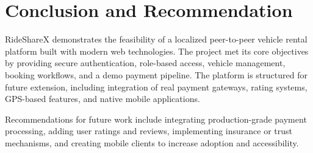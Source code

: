 \chapter{Conclusion and Recommendation}

RideShareX demonstrates the feasibility of a localized peer-to-peer vehicle rental platform built with modern web technologies. The project met its core objectives by providing secure authentication, role-based access, vehicle management, booking workflows, and a demo payment pipeline. The platform is structured for future extension, including integration of real payment gateways, rating systems, GPS-based features, and native mobile applications.

Recommendations for future work include integrating production-grade payment processing, adding user ratings and reviews, implementing insurance or trust mechanisms, and creating mobile clients to increase adoption and accessibility.
